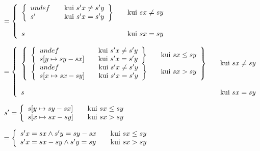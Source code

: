 \(
= 
\left\{
  \begin{array}{l l}

    \left\{ \begin{array}{l l}
      undef & \quad \text{kui}\ s'x \neq s'y \\
      s'   & \quad \text{kui}\ s'x = s'y\\
    \end{array} \right\}
    &  \quad \text{kui}\ sx \neq sy \\
    \\
    s
    & \quad \text{kui}\ sx = sy\\

  \end{array}
\right.
\)

\(
= 
\left\{
  \begin{array}{l l}
  \left\{
    \begin{array}{l l}
    \left\{
      \begin{array}{l l}
        undef & \quad \text{kui}\ s'x \neq s'y \\
        s[y \mapsto sy - sx] & \quad \text{kui}\ s'x = s'y\\
      \end{array}
    \right\} & \quad \text{kui}\ sx \leq sy
\\
    \left\{
      \begin{array}{l l}
        undef & \quad \text{kui}\ s'x \neq s'y \\
        s[x \mapsto sx - sy] & \quad \text{kui}\ s'x = s'y\\
      \end{array}
    \right\} & \quad \text{kui}\ sx > sy
    \end{array}
  \right\}
  &  \quad \text{kui}\ sx \neq sy \\
\\
  s   & \quad \text{kui}\ sx = sy\\
  \end{array}
\right.
\)

\(
s' = 
\left\{\begin{array}{l l}
  s[y \mapsto sy - sx] & \quad \text{kui}\ sx \leq sy\\
  s[x \mapsto sx - sy] & \quad \text{kui}\ sx > sy\\
\end{array} \right.
\)

\(
= 
\left\{\begin{array}{l l}
  s'x = sx \wedge s'y = sy - sx & \quad \text{kui}\ sx \leq sy\\
  s'x = sx - sy \wedge s'y = sy & \quad \text{kui}\ sx > sy\\
\end{array} \right.
\)

